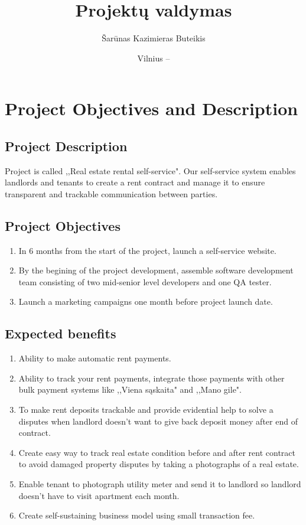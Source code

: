 \documentclass{VUMIFPSkursinis}
\title{Projektų valdymas}
\author{Šarūnas Kazimieras Buteikis}
\date{Vilnius – \the\year}
\begin{document}
\maketitle

\tableofcontents

\section{Project Objectives and Description}
	\subsection{Project Description}
		Project is called ,,Real estate rental self-service". 
		Our self-service system enables landlords and tenants to create a rent contract and manage it to ensure transparent and trackable communication between parties.

	\subsection{Project Objectives}
		\begin{enumerate}
			\item{In 6 months from the start of the project, launch a self-service website.}
			\item{By the begining of the project development, assemble software development team consisting of two mid-senior level developers and one QA tester.}
			\item{Launch a marketing campaigns one month before project launch date.}
		\end{enumerate}

	\subsection{Expected benefits}
		\begin{enumerate}
			\item{Ability to make automatic rent payments.}
			\item{Ability to track your rent payments, integrate those payments with other bulk payment systems like ,,Viena sąskaita" and ,,Mano gile".}
			\item{To make rent deposits trackable and provide evidential help to solve a disputes when landlord doesn't want to give back deposit money after end of contract.}
			\item{Create easy way to track real estate condition before and after rent contract to avoid damaged property disputes by taking a photographs of a real estate.}
			\item{Enable tenant to photograph utility meter and send it to landlord so landlord doesn't have to visit apartment each month.}
			\item{Create self-sustaining business model using small transaction fee.}
		\end{enumerate}
\end{document}
